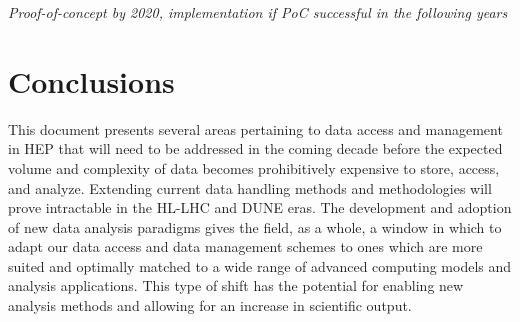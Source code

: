 \documentclass[12pt,a4paper]{article}
\begin{document}
\emph{Proof-of-concept by 2020, implementation if PoC successful in the following years}

\section{Conclusions}\label{conclusions}

This document presents several
areas pertaining to data access and management in HEP that will need to
be addressed in the coming decade before the expected volume and
complexity of data becomes prohibitively expensive to store, access, and
analyze. Extending current data handling methods and methodologies will
prove intractable in the HL-LHC and DUNE eras. The development and
adoption of new data analysis paradigms gives the field, as a whole, a
window in which to adapt our data access and data management schemes to
ones which are more suited and optimally matched to a wide range of
advanced computing models and analysis applications. This type of shift
has the potential for enabling new analysis methods and allowing for an
increase in scientific output.


\sloppy
\raggedright
\clearpage
\printbibliography[title={References},heading=bibintoc]
\end{document}
